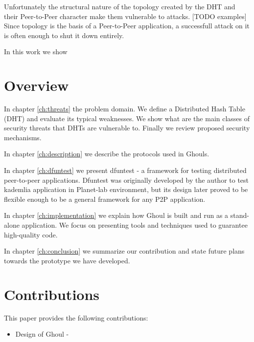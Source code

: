 Unfortunately the structural nature of the topology created by the DHT and their
Peer-to-Peer character make them vulnerable to attacks.
[TODO examples]
Since topology is the basis of a Peer-to-Peer application, a successfull attack
on it is often enough to shut it down entirely.

In this work we show 



\section{Overview}
In chapter \ref{ch:threats} the problem domain.
We define a Distributed Hash Table (DHT) and evaluate its typical weaknesses.
We show what are the main classes of security threats that DHTs are vulnerable to.
Finally we review proposed security mechanisms.

In chapter \ref{ch:description} we describe the protocols used in Ghouls.

In chapter \ref{ch:dfuntest} we present dfuntest - a framework for testing distributed peer-to-peer applications.
Dfuntest was originally developed by the author to test kademlia application in Planet-lab environment, but its design later proved to be flexible enough to be a general framework for any P2P application.

In chapter \ref{ch:implementation} we explain how Ghoul is built and run as a stand-alone application.
We focus on presenting tools and techniques used to guarantee high-quality code.

In chapter \ref{ch:conclusion} we summarize our contribution and state future plans towards the prototype we have developed.

\section{Contributions}
This paper provides the following contributions:
\begin{itemize}
  \item Design of Ghoul - 
\end{itemize}
